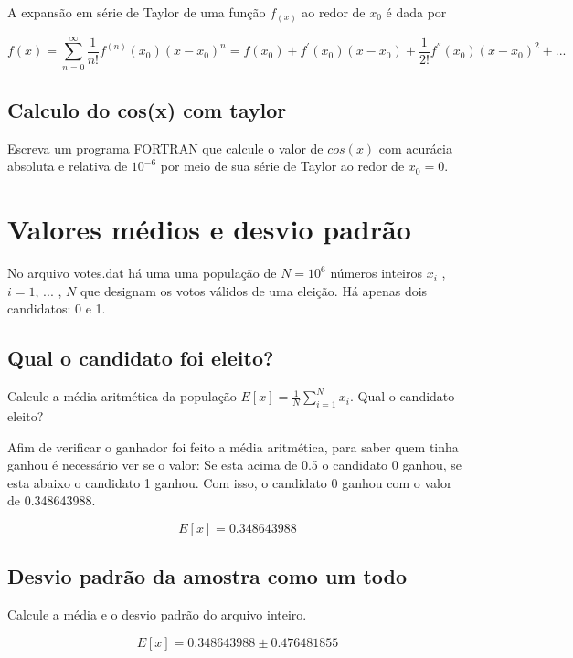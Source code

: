 \documentclass[a4paper, 12pt]{article}
\begin{document}
A expansão em série de Taylor de uma função $f_(x)$ ao redor de $x_0$ é dada por

\begin{equation*}
	f(x) = \sum_{n = 0}^{\infty} \frac{1}{n!} f^{(n)} (x_0) (x - x_0)^{n} = f(x_0) + f^{'}(x_0)(x-x_0) + \frac{1}{2!}f^{''}(x_0)(x-x_0)^2 + ...
\end{equation*}

\subsection{Calculo do cos(x) com taylor}
Escreva um programa FORTRAN que calcule o valor de $cos(x)$ com acurácia absoluta e relativa de $10^{−6}$ por meio de sua série de Taylor ao redor de $x_0 = 0$.

\section{Valores médios e desvio padrão}

No arquivo votes.dat há uma uma população de $N = 10^6$ números inteiros $x_i$ , $i = 1$, $...$ , $N$ que designam os votos
válidos de uma eleição. Há apenas dois candidatos: 0 e 1.

\subsection{Qual o candidato foi eleito?}

Calcule a média aritmética da população $E[x] = \frac{1}{N} \sum_{i = 1}^{N} x_i$. Qual o candidato eleito?

Afim de verificar o ganhador foi feito a média aritmética, para saber quem tinha ganhou é necessário ver se o valor: Se esta acima de 0.5 o candidato 0 ganhou, se esta abaixo o candidato 1 ganhou. Com isso, o candidato 0 ganhou com o valor de 0.348643988.

\begin{equation*}
	E[x] = 0.348643988
\end{equation*}

\subsection{Desvio padrão da amostra como um todo}

Calcule a média e o desvio padrão do arquivo inteiro.

\begin{equation*}
	E[x] = 0.348643988 \pm 0.476481855 
\end{equation*}
\end{document}
